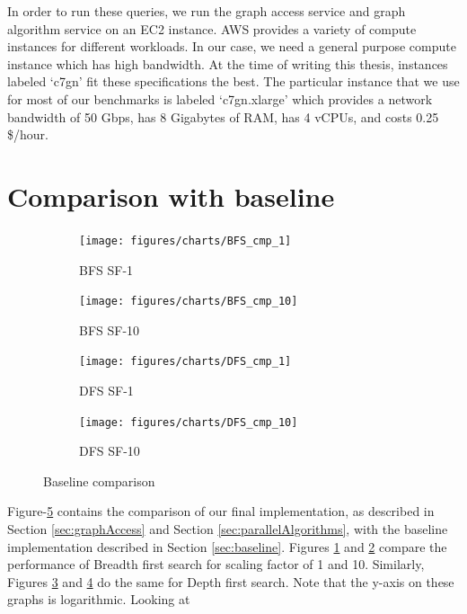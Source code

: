\medskip
In order to run these queries, we run the graph access service and graph
algorithm service on an EC2 instance\cite{awsEC2}. AWS provides a variety of
compute instances for different workloads. In our case, we need a general
purpose compute instance which has high bandwidth. At the time of writing this
thesis, instances labeled `c7gn' fit these specifications the best. The
particular instance that we use for most of our benchmarks is labeled
`c7gn.xlarge' which provides a network bandwidth of 50 Gbps, has 8 Gigabytes of
RAM, has 4 vCPUs, and costs 0.25 \$/hour.

\section{Comparison with baseline}\label{sec:cmpBaseline}
\begin{figure}[ht]
    \centering
    \begin{subfigure}[b]{0.48\textwidth}
        \centering
        \texttt{[image: figures/charts/BFS\_cmp\_1]}
        \caption{BFS SF-1}
        \label{fig:bfsSf1}
    \end{subfigure}
    \hfill
    \begin{subfigure}[b]{0.48\textwidth}
        \texttt{[image: figures/charts/BFS\_cmp\_10]}
        \caption{BFS SF-10}
        \label{fig:bfsSf10}
    \end{subfigure}
    \begin{subfigure}[b]{0.48\textwidth}
        \centering
        \texttt{[image: figures/charts/DFS\_cmp\_1]}
        \caption{DFS SF-1}
        \label{fig:dfsSf1}
    \end{subfigure}
    \hfill
    \begin{subfigure}[b]{0.48\textwidth}
        \texttt{[image: figures/charts/DFS\_cmp\_10]}
        \caption{DFS SF-10}
        \label{fig:dfsSf10}
    \end{subfigure}
    \caption{Baseline comparison}
    \label{fig:baselineCmp}
\end{figure}
Figure-\ref{fig:baselineCmp} contains the comparison of our final
implementation, as described in Section \ref{sec:graphAccess} and Section 
\ref{sec:parallelAlgorithms}, with the baseline implementation described in
Section \ref{sec:baseline}. Figures \ref{fig:bfsSf1} and \ref{fig:bfsSf10}
compare the performance of Breadth first search for scaling factor of 1 and 10.
Similarly, Figures \ref{fig:dfsSf1} and \ref{fig:dfsSf10} do the same for Depth
first search. Note that the y-axis on these graphs is logarithmic. Looking at
